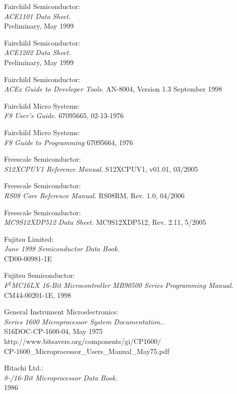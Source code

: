  Fairchild Semiconductor: \\
		{\em ACE1101 Data Sheet.\/} \\
		Preliminary, May 1999

 Fairchild Semiconductor: \\
		{\em ACE1202 Data Sheet.\/} \\
		Preliminary, May 1999

 Fairchild Semiconductor: \\
		{\em ACEx Guide to Developer Tools.\/}
		AN-8004, Version 1.3 September 1998

 Fairchild Micro Systems: \\
		{\em F8 User's Guide.\/}
		67095665, 02-13-1976

 Fairchild Micro Systems: \\
		{\em F8 Guide to Programming\/}
		67095664, 1976

 Freescale Semiconductor: \\
		{\em S12XCPUV1 Reference Manual.\/}
		S12XCPUV1, v01.01, 03/2005

 Freescale Semiconductor: \\
		{\em RS08 Core Reference Manual.\/}
		RS08RM, Rev. 1.0, 04/2006

 Freescale Semiconductor: \\
		{\em MC9S12XDP512 Data Sheet.\/}
		MC9S12XDP512, Rev. 2.11, 5/2005

 Fujitsu Limited: \\
		{\em June 1998 Semiconductor Data Book.\/} \\
		CD00-00981-1E

 Fujitsu Semiconductor: \\
		{\em F$^2$MC16LX 16-Bit Microcontroller MB90500 Series
		Programming Manual.\/} \\
		CM44-00201-1E, 1998

 General Instrument Microelectronics: \\
		{\em Series 1600 Microprocessor System Documentation..\/} \\
		S16DOC-CP-1600-04, May 1975 \\
		http://www.bitsavers.org/components/gi/CP1600/ \\
		CP-1600\_Microprocessor\_Users\_Manual\_May75.pdf

 Hitachi Ltd.: \\
		{\em 8-/16-Bit Microprocessor Data Book.\/} \\
		1986

